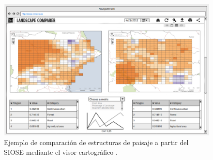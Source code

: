 \begin{figure}
\begin{center}
\includegraphics[width=\textwidth]{ConclusionyFuturo/Figs/visor-final.png}
\caption{Ejemplo de comparación de estructuras de paisaje a partir del SIOSE mediante el visor cartográfico . \label{fig:visor-final}}
\end{center}
\end{figure}
